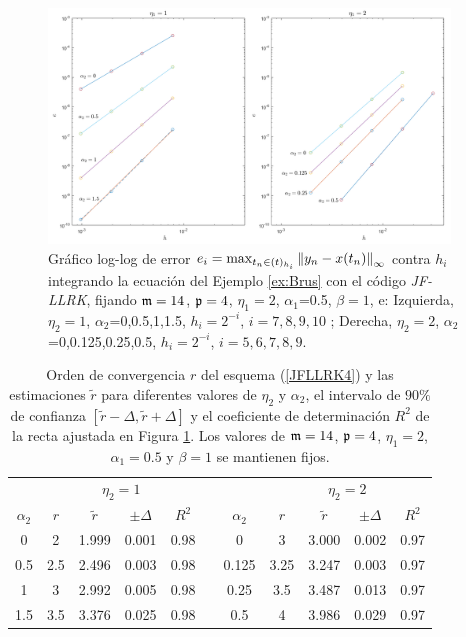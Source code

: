 \begin{figure}[htb]
	\centering
	\includegraphics[width=0.95\textwidth]{Graphics/lldp-fj/out_new.png}
	\caption{Gráfico log-log de error $e_i=\max_{t_n\in(t)_{h_i}}\left\lVert y_n-x(t_n) \right\rVert_\infty$ contra $h_i$ integrando la ecuación del Ejemplo \ref{ex:Brus} con el código \textit{JF-LLRK}, fijando $\mathfrak{m}=14$, $\mathfrak{p}=4$, $\eta_1=2$, $\alpha_1$=0.5, $\beta=1$, e: Izquierda, $\eta_2=1$, $\alpha_2$=0,0.5,1,1.5, $h_i=2^{-i}$, $i=7,8,9,10$ ; Derecha, $\eta_2=2$, $\alpha_2$=0,0.125,0.25,0.5, $h_i=2^{-i}$, $i=5,6,7,8,9$.}
	\label{Fig2}
\end{figure}

\begin{table}[htb]
	\centering
	\caption{
		Orden de convergencia $r$ del esquema (\ref{JFLLRK4}) y las estimaciones $\widetilde{r}$ para diferentes valores de $\eta_2$ y $\alpha_2$, el intervalo de $90\%$ de confianza $[\widetilde{r}-\varDelta,\widetilde{r}+\varDelta]$ y el coeficiente de determinación $R^2$ de la recta ajustada en Figura \ref{Fig2}. Los valores de $\mathfrak{m}=14$, $\mathfrak{p}=4$, $\eta_1=2$, $\alpha_1=0\mathord{.}5$ y $\beta=1$ se mantienen fijos. }
	\begin{adjustbox}{width=0.8\columnwidth,center}
		\begin{tabular}{ c  c c c c  c  c c c c c}
			\hline
			& \multicolumn{4}{c}{$\eta_2=1$} & & & \multicolumn{4}{c}{$\eta_2=2$} \\
			\cline{2-5} \cline{8-11}
			$\alpha_2$ & $r$ & $\widetilde{r}$ & $\pm\varDelta$ & $R^2$ & & $\alpha_2$ & $r$ & $\widetilde{r}$ & $\pm\varDelta$ & $R^2$ \\
			\hline
			0 & 2 & 1.999 & 0.001 & 0.98 & & 0 & 3 & 3.000 & 0.002 & 0.97 \\
			0.5 & 2.5 & 2.496 & 0.003 & 0.98 & & 0.125 & 3.25 & 3.247 & 0.003 & 0.97 \\
			1 & 3 & 2.992 & 0.005 & 0.98 & & 0.25 & 3.5 & 3.487 & 0.013 & 0.97 \\
			1.5 & 3.5 & 3.376 & 0.025 & 0.98 & & 0.5 & 4 & 3.986 & 0.029 & 0.97 \\
			\hline
		\end{tabular}
	\end{adjustbox}
	\label{tab:out}
\end{table}




